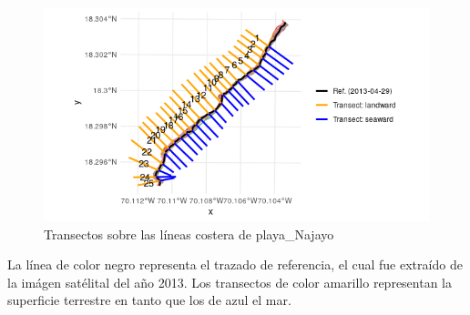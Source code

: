 \documentclass[11pt,]{article}
\begin{document}
\begin{figure}
\centering
\includegraphics{transect_linea_R.png}
\caption{Transectos sobre las líneas costera de
playa\_Najayo\label{transect_linea}}
\end{figure}

La línea de color negro representa el trazado de referencia, el cual fue
extraído de la imágen satélital del año 2013. Los transectos de color
amarillo representan la superficie terrestre en tanto que los de azul el
mar.
\end{document}
